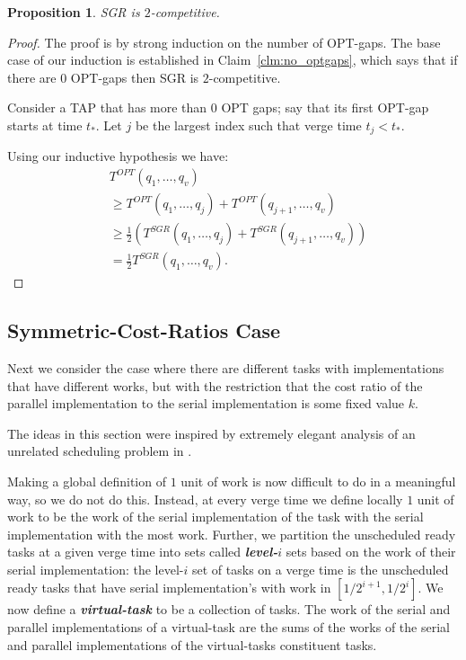 \documentclass[twocolumn]{article}[10pt]
\newcommand{\defn}[1]{{\textit{\textbf{\boldmath #1}}}\xspace}
\newcommand{\paren}[1]{\left( #1 \right)}
\newtheorem{proposition}{Proposition}
\begin{document}
\begin{proposition}
  \label{prop:2competitive}
  SGR is $2$-competitive.
\end{proposition}
\begin{proof}
  The proof is by strong induction on the number of OPT-gaps. 
  The base case of our induction is established in
  Claim~\ref{clm:no_optgaps}, which says that if there are $0$
  OPT-gaps then SGR is $2$-competitive. 

  Consider a TAP that has more than $0$ OPT gaps;
  say that its first OPT-gap starts at time $t_*$.
  Let $j$ be the largest index such that verge time $t_j <
  t_*$.

  Using our inductive hypothesis we have:
  \begin{align*}
  &T^{OPT}(q_1, \ldots, q_v) \\
  &\ge T^{OPT}(q_1, \ldots, q_j) + T^{OPT}(q_{j+1}, \ldots, q_{v})\\
  &\ge \frac{1}{2}\paren{T^{SGR}(q_1, \ldots, q_j) + T^{SGR}(q_{j+1}, \ldots, q_{v})}\\
  &=\frac{1}{2} T^{SGR}(q_1, \ldots, q_v).
  \end{align*}

\end{proof}


\subsection{Symmetric-Cost-Ratios Case}
\label{subsec:symmetriccostratio}
Next we consider the case where there are different tasks with
implementations that have different works, but with the
restriction that the cost ratio of the parallel implementation to
the serial implementation is some fixed value $k$.

The ideas in this section were inspired by extremely elegant
analysis of an unrelated scheduling problem in \cite{bamboo20}.

Making a global definition of $1$ unit of work is now difficult
to do in a meaningful way, so we do not do this. Instead, at
every verge time we define locally $1$ unit of work to be the
work of the serial implementation of the task with the serial
implementation with the most work. 
Further, we partition the unscheduled ready tasks at a given verge time into
sets called \defn{level-$i$} sets based on the work of their serial
implementation: the level-$i$ set of tasks on a verge time is the
unscheduled ready tasks that have serial implementation's with
work in $[1/2^{i+1}, 1/2^{i}]$.
We now define a \defn{virtual-task} to be a collection of tasks.
The work of the serial and parallel implementations of a
virtual-task are the sums of the works of the serial and parallel
implementations of the virtual-tasks constituent tasks.
\end{document}

